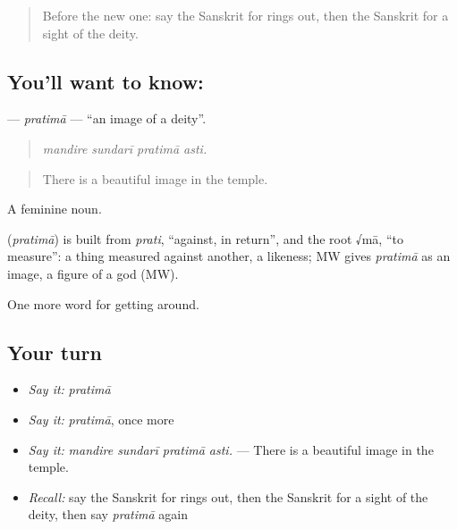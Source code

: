 \label{lesson:SA-C396-pratima}



\begin{quote}
Before the new one: say the Sanskrit for rings out, then the Sanskrit for a sight of the deity.
\end{quote}

\subsection*{You'll want to know: }
\textbf{} — \emph{pratimā} — \textquotedblleft{}an image of a deity\textquotedblright{}.

\begin{quote}
   
\end{quote}

\begin{quote}
\emph{mandire sundarī pratimā asti.}
\end{quote}

\begin{quote}
There is a beautiful image in the temple.
\end{quote}

A feminine noun.

\begin{cousinweb}
\textbf{} (\emph{pratimā}) is built from \emph{prati}, \textquotedblleft{}against, in return\textquotedblright{}, and the root √mā, \textquotedblleft{}to measure\textquotedblright{}: a thing measured against another, a likeness; MW gives \emph{pratimā} as an image, a figure of a god (MW).
\end{cousinweb}

\begin{grammarlens}[title={What you've built}]
One more word for getting around.
\end{grammarlens}

\subsection*{Your turn}
\begin{itemize}
\raggedright
  \item \emph{Say it:} \emph{pratimā}
  \item \emph{Say it:} \emph{pratimā}, once more
  \item \emph{Say it:} \emph{mandire sundarī pratimā asti.} — There is a beautiful image in the temple.
  \item \emph{Recall:} say the Sanskrit for rings out, then the Sanskrit for a sight of the deity, then say \emph{pratimā} again
\end{itemize}

